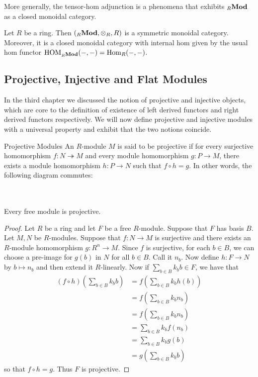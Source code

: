\documentclass[a4paper]{article}
\begin{document}
More generally, the tensor-hom adjunction is a phenomena that exhibits ${_R}\bold{Mod}$  as a closed monoidal category. 

\begin{thm}{}{} Let $R$ be a ring. Then $({_R}\bold{Mod},\otimes_R,R)$ is a symmetric monoidal category. Moreover, it is a closed monoidal category with internal hom given by the usual hom functor $\text{HOM}_{{_R}\bold{Mod}}(-,-)=\operatorname{Hom}_R(-,-)$. 
\end{thm}

\subsection{Projective, Injective and Flat Modules}
In the third chapter we discussed the notion of projective and injective objects, which are core to the definition of existence of left derived functors and right derived functors respectively. We will now define projective and injective modules with a universal property and exhibit that the two notions coincide. 

\begin{defn}{Projective Modules}{} An $R$-module $M$ is said to be projective if for every surjective homomorphism $f:N\twoheadrightarrow M$ and every module homomorphism $g:P\to M$, there exists a module homomorphism $h:P\to N$ such that $f\circ h=g$. In other words, the following diagram commutes: \\~\\
 \\
\end{defn}

\begin{lmm}{}{} Every free module is projective. \tcbline
\begin{proof}
Let $R$ be a ring and let $F$ be a free $R$-module. Suppose that $F$ has basis $B$. Let $M,N$ be $R$-modules. Suppose that $f:N\to M$ is surjective and there exists an $R$-module homomorphism $g:R^n\to M$. Since $f$ is surjective, for each $b\in B$, we can choose a pre-image for $g(b)$ in $N$ for all $b\in B$. Call it $n_b$. Now define $h:F\to N$ by $b\mapsto n_b$ and then extend it $R$-linearly. Now if $\sum_{b\in B}k_bb\in F$, we have that 
\begin{align*}
(f\circ h)\left(\sum_{b\in B}k_bb\right)&=f\left(\sum_{b\in B}k_bh(b)\right)\\
&=f\left(\sum_{b\in B}k_bn_b\right)\\
&=f\left(\sum_{b\in B}k_bn_b\right)\\
&=\sum_{b\in B}k_bf(n_b)\\
&=\sum_{b\in B}k_bg(b)\\
&=g\left(\sum_{b\in B}k_bb\right)
\end{align*}
so that $f\circ h=g$. Thus $F$ is projective. 
\end{proof}
\end{lmm}
\end{document}
